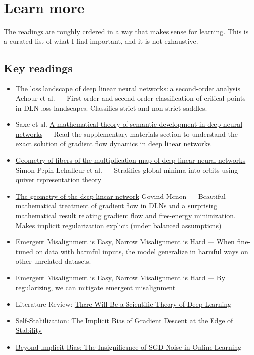 \documentclass[11pt]{article}
\begin{document}
\section*{Learn more}

The readings are roughly ordered in a way that makes sense for learning. This is a curated list of what I find important, and it is not exhaustive.

\subsection*{Key readings}
\begin{itemize}
  \item \href{https://arxiv.org/abs/2107.13289}{The loss landscape of deep linear neural networks: a second-order analysis} Achour et al. --- First-order and second-order classification of critical points in DLN loss landscapes. Classifies strict and non-strict saddles.
  \item Saxe et al. \href{https://www.pnas.org/doi/10.1073/pnas.1820226116}{A mathematical theory of semantic development in deep neural networks} --- Read the supplementary materials section to understand the exact solution of gradient flow dynamics in deep linear networks
  \item \href{https://arxiv.org/abs/2411.19920}{Geometry of fibers of the multiplication map of deep linear neural networks} Simon Pepin Lehalleur et al. --- Stratifies global minima into orbits using quiver representation theory
  \item \href{https://arxiv.org/abs/2411.09004}{The geometry of the deep linear network} Govind Menon --- Beautiful mathematical treatment of gradient flow in DLNs and a surprising mathematical result relating gradient flow and free-energy minimization. Makes implicit regularization explicit (under balanced assumptions)
  \item \href{https://arxiv.org/abs/2602.07852}{Emergent Misalignment is Easy, Narrow Misalignment is Hard} --- When fine-tuned on data with harmful inputs, the model generalize in harmful ways on other unrelated datasets.
  \item \href{https://arxiv.org/abs/2602.07852}{Emergent Misalignment is Easy, Narrow Misalignment is Hard} --- By regularizing, we can mitigate emergent misalignment
  \item Literature Review: \href{https://arxiv.org/abs/2604.21691}{There Will Be a Scientific Theory of Deep Learning}
  \item \href{https://arxiv.org/abs/2209.15594}{Self-Stabilization: The Implicit Bias of Gradient Descent at the Edge of Stability}
  \item \href{https://arxiv.org/abs/2306.08590}{Beyond Implicit Bias: The Insignificance of SGD Noise in Online Learning}
\end{itemize}
\end{document}
